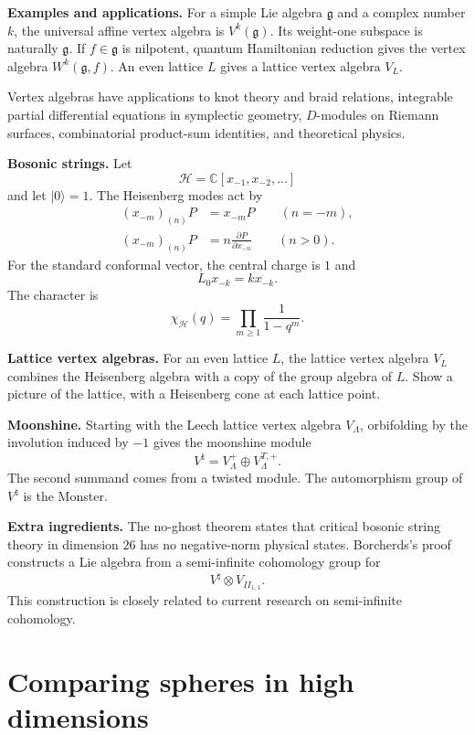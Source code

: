 \medskip\noindent
{\bf Examples and applications.}
For a simple Lie algebra $\mathfrak{g}$ and a
complex number $k$, the universal affine
vertex algebra is $V^k(\mathfrak{g})$. Its
weight-one subspace is naturally
$\mathfrak{g}$. If $f\in\mathfrak{g}$ is
nilpotent, quantum Hamiltonian reduction
gives the vertex algebra
$W^k(\mathfrak{g},f)$. An even lattice $L$
gives a lattice vertex algebra
$V_L$.

Vertex algebras have applications to knot
theory and braid relations, integrable
partial differential equations in
symplectic geometry,
$D$-modules on Riemann surfaces,
combinatorial product-sum identities, and
theoretical physics.

\medskip\noindent
{\bf Bosonic strings.}
Let
$$
\mathcal{H}=\mathbb{C}[x_{-1},x_{-2},\ldots]
$$
and let $|0\rangle=1$. The Heisenberg modes
act by
$$
\begin{aligned}
(x_{-m})_{(n)}P&=x_{-m}P\qquad(n=-m),\\
(x_{-m})_{(n)}P&=n
\frac{\partial P}{\partial x_{-n}}
\qquad(n>0).
\end{aligned}
$$
For the standard conformal vector, the
central charge is $1$ and
$$
L_0x_{-k}=kx_{-k}.
$$
The character is
$$
\chi_{\mathcal{H}}(q)=
\prod_{m\geq1}\frac{1}{1-q^m}.
$$

\medskip\noindent
{\bf Lattice vertex algebras.}
For an even lattice $L$, the lattice vertex
algebra $V_L$ combines the Heisenberg algebra
with a copy of the group algebra of $L$.
Show a picture of the lattice, with a
Heisenberg cone at each lattice point.

\medskip\noindent
{\bf Moonshine.}
Starting with the Leech lattice vertex
algebra $V_\Lambda$, orbifolding by the
involution
induced by $-1$ gives the moonshine module
$$
V^{\natural}=V_\Lambda^+
\oplus V_\Lambda^{T,+}.
$$
The second summand comes from a twisted
module.
The automorphism group of $V^{\natural}$ is
the Monster.

\medskip\noindent
{\bf Extra ingredients.}
The no-ghost theorem states that critical
bosonic string theory in dimension $26$ has
no negative-norm physical states. Borcherds's
proof constructs a Lie algebra from a
semi-infinite cohomology group for
$$
V^{\natural}\otimes V_{II_{1,1}}.
$$
This construction is closely related to
current research on semi-infinite cohomology.



\section{Comparing spheres in high
dimensions}
\label{section-comparing-spheres}

